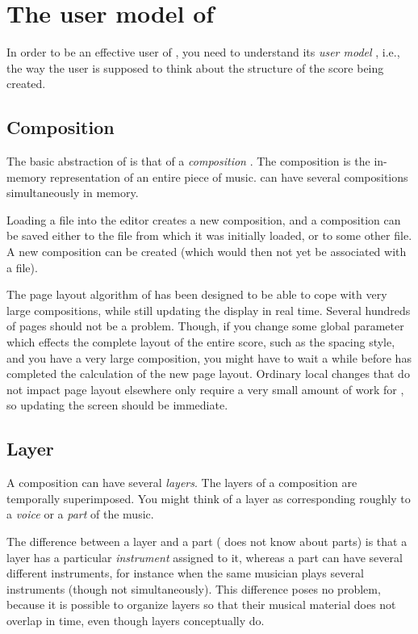 \chapter{The user model of \sysname{}}
\label{chap-user-model}

In order to be an effective user of \sysname{}, you need to understand
its \emph{user model} , i.e., the way the user is
supposed to think about the structure of the score being created.

\section{Composition}
\label{sec-model-composition}

The basic abstraction of \sysname{} is that of a \emph{composition}
.  The composition is the in-memory representation
of an entire piece of music.  \sysname{} can have several
compositions simultaneously in memory.

Loading a \sysname{} file into the editor creates a new composition,
and a composition can be saved either to the file from which it was
initially loaded, or to some other file.  A new composition can be
created (which would then not yet be associated with a file).

The page layout algorithm of \sysname{} has been designed to be able
to cope with very large compositions, while still updating the display
in real time.  Several hundreds of pages should not be a problem.
Though, if you change some global parameter which effects the complete
layout of the entire score, such as the spacing style, and you have a
very large composition, you might have to wait a while before
\sysname{} has completed the calculation of the new page layout.
Ordinary local changes that do not impact page layout elsewhere only
require a very small amount of work for \sysname{}, so updating the
screen should be immediate.

\section{Layer}

A composition can have several \emph{layers}.  The layers
of a composition are temporally superimposed.  You might think of a layer
as corresponding roughly to a \emph{voice}  or a
\emph{part}  of the music.

The difference between a layer and a part (\sysname{} does not know
about parts) is that a layer has a particular \emph{instrument}
 assigned to it, whereas a part can have several
different instruments, for instance when the same musician plays
several instruments (though not simultaneously).  This difference
poses no problem, because it is possible to organize \sysname{} layers
so that their musical material does not overlap in time, even though
layers conceptually do.

